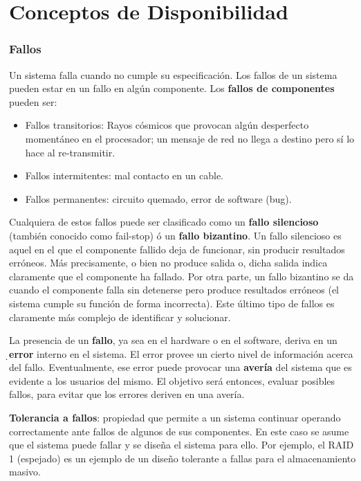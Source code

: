 \section{Conceptos de Disponibilidad}

\subsubsection*{Fallos}  
	Un sistema falla cuando no cumple su especificación. Los fallos de un sistema pueden estar en un fallo en algún componente. Los {\bf fallos de componentes} pueden ser: 
	\begin{itemize}
	\item Fallos transitorios: Rayos cósmicos que provocan algún desperfecto momentáneo en el procesador; un mensaje de red no llega a destino pero sí lo hace al re-transmitir. 
	\item Fallos intermitentes: mal contacto en un cable. 
	\item Fallos permanentes: circuito quemado, error de software (bug).
	\end{itemize}
	
	Cualquiera de estos fallos puede ser clasificado como un {\bf fallo silencioso} (también conocido como fail-stop) ó un {\bf fallo bizantino}. Un fallo silencioso es aquel en el que el componente fallido deja de funcionar, sin producir resultados erróneos. Más precisamente, o bien no produce salida o, dicha salida indica claramente que el componente ha fallado. Por otra parte, un fallo bizantino se da cuando el componente falla sin detenerse pero produce resultados erróneos (el sistema cumple su función de forma incorrecta). Este último tipo de fallos es claramente más complejo de identificar y solucionar. 

La presencia de un {\bf fallo}, ya sea en el hardware o en el software, deriva en un {̣\bf error} interno en el sistema. El error provee un cierto nivel de información acerca del fallo. Eventualmente, ese error puede provocar una {\bf avería} del sistema que es evidente a los usuarios del mismo. El objetivo será entonces, evaluar posibles fallos, para evitar que los errores deriven en una avería.

{\bf Tolerancia a fallos}: propiedad que permite a un sistema continuar operando correctamente ante fallos de algunos de sus componentes. En este caso se 
asume que el sistema puede fallar y se diseña el sistema para ello. Por ejemplo, el RAID 1 (espejado) es un ejemplo de un diseño tolerante a fallas para el 
almacenamiento masivo. 



